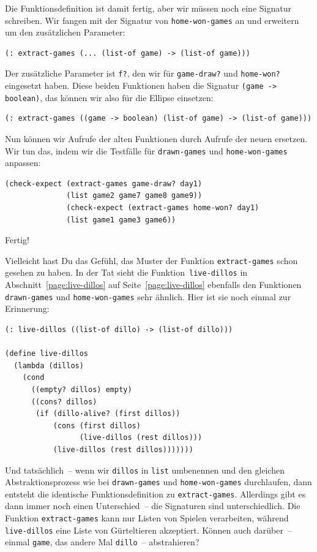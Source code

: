Die Funktionsdefinition ist damit fertig, aber wir müssen noch eine
Signatur schreiben.  Wir fangen mit der Signatur von
\lstinline{home-won-games} an und erweitern um den zusätzlichen
Parameter:
%
\begin{lstlisting}
(: extract-games (... (list-of game) -> (list-of game)))
\end{lstlisting}
%
Der zusätzliche Parameter ist \lstinline{f?}, den wir für
\lstinline{game-draw?} und \lstinline{home-won?} eingesetzt haben.
Diese beiden Funktionen haben die Signatur
\lstinline{(game -> boolean)}, das können wir also für die Ellipse
einsetzen:
%
\begin{lstlisting}
(: extract-games ((game -> boolean) (list-of game) -> (list-of game)))
\end{lstlisting}
%
Nun können wir Aufrufe der alten Funktionen durch Aufrufe der neuen
ersetzen.  Wir tun das, indem wir die Testfälle für
\lstinline{drawn-games} und \lstinline{home-won-games} anpassen:
%
\begin{lstlisting}
(check-expect (extract-games game-draw? day1)
              (list game2 game7 game8 game9))
              (check-expect (extract-games home-won? day1)
              (list game1 game3 game6))
\end{lstlisting}
%
Fertig!

Vielleicht hast Du das Gefühl, das Muster der Funktion
\lstinline{extract-games} schon gesehen zu haben.  In der Tat sieht
die Funktion~\lstinline{live-dillos} in
Abschnitt~\ref{page:live-dillos} auf
Seite~\ref{page:live-dillos} ebenfalls den Funktionen
\lstinline{drawn-games} und \lstinline{home-won-games} sehr ähnlich.
Hier ist sie noch einmal zur Erinnerung:
%
\begin{lstlisting}
(: live-dillos ((list-of dillo) -> (list-of dillo)))

(define live-dillos
  (lambda (dillos)
    (cond
      ((empty? dillos) empty)
      ((cons? dillos)
       (if (dillo-alive? (first dillos))
           (cons (first dillos)
                 (live-dillos (rest dillos)))
           (live-dillos (rest dillos)))))))
\end{lstlisting}
%
Und tatsächlich~-- wenn wir \lstinline{dillos} in \lstinline{list}
umbenennen und den gleichen Abstraktionsprozess wie bei
\lstinline{drawn-games} und \lstinline{home-won-games} durchlaufen,
dann entsteht die identische Funktionsdefinition zu
\lstinline{extract-games}.  Allerdings gibt es dann immer noch einen
Unterschied~-- die Signaturen sind unterschiedlich.
Die Funktion \lstinline{extract-games} kann nur Listen von Spielen
verarbeiten, während \lstinline{live-dillos} eine Liste von
Gürteltieren akzeptiert.  Können auch darüber~-- einmal
\lstinline{game}, das andere Mal \lstinline{dillo}~-- abstrahieren?

